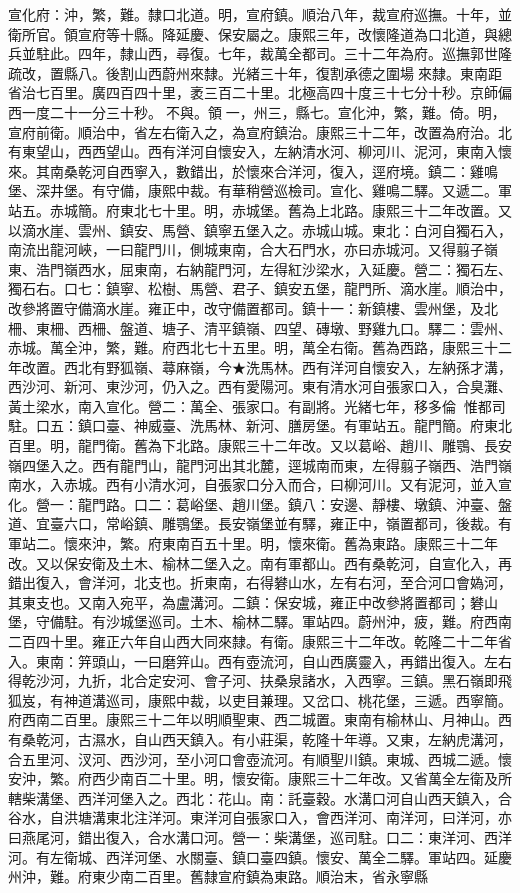 \begin{pinyinscope}
宣化府：沖，繁，難。隸口北道。明，宣府鎮。順治八年，裁宣府巡撫。十年，並衛所官。領宣府等十縣。降延慶、保安屬之。康熙三年，改懷隆道為口北道，與總兵並駐此。四年，隸山西，尋復。七年，裁萬全都司。三十二年為府。巡撫郭世隆疏改，置縣八。後割山西蔚州來隸。光緒三十年，復割承德之圍場來隸。東南距省治七百里。廣四百四十里，袤三百二十里。北極高四十度三十七分十秒。京師偏西一度二十一分三十秒。不與。領一，州三，縣七。宣化沖，繁，難。倚。明，宣府前衛。順治中，省左右衛入之，為宣府鎮治。康熙三十二年，改置為府治。北有東望山，西西望山。西有洋河自懷安入，左納清水河、柳河川、泥河，東南入懷來。其南桑乾河自西寧入，數錯出，於懷來合洋河，復入，逕府境。鎮二：雞鳴堡、深井堡。有守備，康熙中裁。有華稍營巡檢司。宣化、雞鳴二驛。又遞二。軍站五。赤城簡。府東北七十里。明，赤城堡。舊為上北路。康熙三十二年改置。又以滴水崖、雲州、鎮安、馬營、鎮寧五堡入之。赤城山城。東北：白河自獨石入，南流出龍河峽，一曰龍門川，側城東南，合大石門水，亦曰赤城河。又得翦子嶺東、浩門嶺西水，屈東南，右納龍門河，左得紅沙梁水，入延慶。營二：獨石左、獨石右。口七：鎮寧、松樹、馬營、君子、鎮安五堡，龍門所、滴水崖。順治中，改參將置守備滴水崖。雍正中，改守備置都司。鎮十一：新鎮樓、雲州堡，及北柵、東柵、西柵、盤道、塘子、清平鎮嶺、四望、磚墩、野雞九口。驛二：雲州、赤城。萬全沖，繁，難。府西北七十五里。明，萬全右衛。舊為西路，康熙三十二年改置。西北有野狐嶺、蕁麻嶺，今★洗馬林。西有洋河自懷安入，左納孫才溝，西沙河、新河、東沙河，仍入之。西有愛陽河。東有清水河自張家口入，合臭灘、黃土梁水，南入宣化。營二：萬全、張家口。有副將。光緒七年，移多倫，惟都司駐。口五：鎮口臺、神威臺、洗馬林、新河、膳房堡。有軍站五。龍門簡。府東北百里。明，龍門衛。舊為下北路。康熙三十二年改。又以葛峪、趙川、雕鶚、長安嶺四堡入之。西有龍門山，龍門河出其北麓，逕城南而東，左得翦子嶺西、浩門嶺南水，入赤城。西有小清水河，自張家口分入而合，曰柳河川。又有泥河，並入宣化。營一：龍門路。口二：葛峪堡、趙川堡。鎮八：安邊、靜樓、墩鎮、沖臺、盤道、宜臺六口，常峪鎮、雕鶚堡。長安嶺堡並有驛，雍正中，嶺置都司，後裁。有軍站二。懷來沖，繁。府東南百五十里。明，懷來衛。舊為東路。康熙三十二年改。又以保安衛及土木、榆林二堡入之。南有軍都山。西有桑乾河，自宣化入，再錯出復入，會洋河，北支也。折東南，右得礬山水，左有右河，至合河口會媯河，其東支也。又南入宛平，為盧溝河。二鎮：保安城，雍正中改參將置都司；礬山堡，守備駐。有沙城堡巡司。土木、榆林二驛。軍站四。蔚州沖，疲，難。府西南二百四十里。雍正六年自山西大同來隸。有衛。康熙三十二年改。乾隆二十二年省入。東南：笄頭山，一曰磨笄山。西有壺流河，自山西廣靈入，再錯出復入。左右得乾沙河，九折，北合定安河、會子河、扶桑泉諸水，入西寧。三鎮。黑石嶺即飛狐岌，有神道溝巡司，康熙中裁，以吏目兼理。又岔口、桃花堡，三遞。西寧簡。府西南二百里。康熙三十二年以明順聖東、西二城置。東南有榆林山、月神山。西有桑乾河，古濕水，自山西天鎮入。有小莊渠，乾隆十年導。又東，左納虎溝河，合五里河、汊河、西沙河，至小河口會壺流河。有順聖川鎮。東城、西城二遞。懷安沖，繁。府西少南百二十里。明，懷安衛。康熙三十二年改。又省萬全左衛及所轄柴溝堡、西洋河堡入之。西北：花山。南：託臺穀。水溝口河自山西天鎮入，合谷水，自洪塘溝東北注洋河。東洋河自張家口入，會西洋河、南洋河，曰洋河，亦曰燕尾河，錯出復入，合水溝口河。營一：柴溝堡，巡司駐。口二：東洋河、西洋河。有左衛城、西洋河堡、水關臺、鎮口臺四鎮。懷安、萬全二驛。軍站四。延慶州沖，難。府東少南二百里。舊隸宣府鎮為東路。順治末，省永寧縣
\end{pinyinscope}
